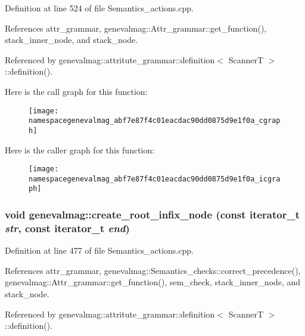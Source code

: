 Definition at line 524 of file Semantics\_\-actions.cpp.



References attr\_\-grammar, genevalmag::Attr\_\-grammar::get\_\-function(), stack\_\-inner\_\-node, and stack\_\-node.



Referenced by genevalmag::attritute\_\-grammar::definition$<$ ScannerT $>$::definition().



Here is the call graph for this function:\nopagebreak
\begin{figure}[H]
\begin{center}
\leavevmode
\texttt{[image: namespacegenevalmag\_abf7e87f4c01eacdac90dd0875d9e1f0a\_cgraph]}
\end{center}
\end{figure}




Here is the caller graph for this function:\nopagebreak
\begin{figure}[H]
\begin{center}
\leavevmode
\texttt{[image: namespacegenevalmag\_abf7e87f4c01eacdac90dd0875d9e1f0a\_icgraph]}
\end{center}
\end{figure}


\hypertarget{namespacegenevalmag_a2a5aaaff7c3b3b8efc446903121a62c6}{
\subsubsection[{create\_\-root\_\-infix\_\-node}]{\setlength{\rightskip}{0pt plus 5cm}void genevalmag::create\_\-root\_\-infix\_\-node (const iterator\_\-t {\em str}, \/  const iterator\_\-t {\em end})}}
\label{namespacegenevalmag_a2a5aaaff7c3b3b8efc446903121a62c6}


Definition at line 477 of file Semantics\_\-actions.cpp.



References attr\_\-grammar, genevalmag::Semantics\_\-checks::correct\_\-precedence(), genevalmag::Attr\_\-grammar::get\_\-function(), sem\_\-check, stack\_\-inner\_\-node, and stack\_\-node.



Referenced by genevalmag::attritute\_\-grammar::definition$<$ ScannerT $>$::definition().



